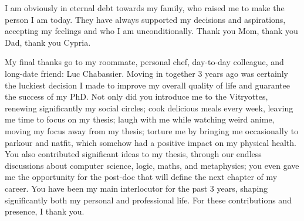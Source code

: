 I am obviously in eternal debt towards my family, who raised me to make the person I am today. They have always supported my decisions and aspirations, accepting my feelings and who I am unconditionally. Thank you Mom, thank you Dad, thank you Cypria.

My final thanks go to my roommate, personal chef, day-to-day colleague, and long-date friend: Luc Chabassier. Moving in together 3 years ago was certainly the luckiest decision I made to improve my overall quality of life and guarantee the success of my PhD. Not only did you introduce me to the Vitryottes, renewing significantly my social circles; cook delicious meals every week, leaving me time to focus on my thesis; laugh with me while watching weird anime, moving my focus away from my thesis; torture me by bringing me occasionally to parkour and natfit, which somehow had a positive impact on my physical health. You also contributed significant ideas to my thesis, through our endless discussions about computer science, logic, maths, and metaphysics; you even gave me the opportunity for the post-doc that will define the next chapter of my career. You have been my main interlocutor for the past 3 years, shaping significantly both my personal and professional life. For these contributions and presence, I thank you.